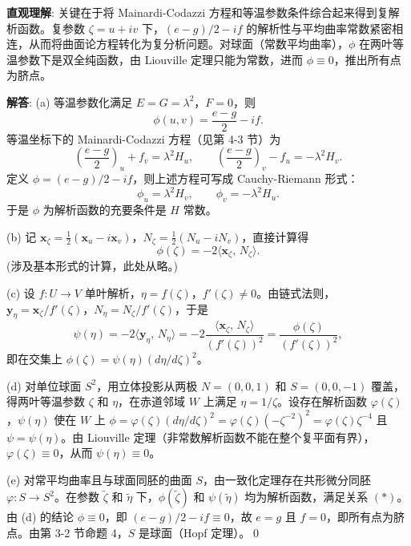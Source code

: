 \begin{solution}
\textbf{直观理解}: 关键在于将 Mainardi-Codazzi 方程和等温参数条件综合起来得到复解析函数。复参数 $\zeta = u+iv$ 下，$(e-g)/2 - if$ 的解析性与平均曲率常数紧密相连，从而将曲面论方程转化为复分析问题。对球面（常数平均曲率），$\phi$ 在两叶等温参数下是双全纯函数，由 Liouville 定理只能为常数，进而 $\phi\equiv 0$，推出所有点为脐点。

\textbf{解答}: (a) 等温参数化满足 $E=G=\lambda^2$，$F=0$，则
\[
\phi(u,v) = \frac{e-g}{2} - if.
\]
等温坐标下的 Mainardi-Codazzi 方程（见第 4-3 节）为
\[
\left(\frac{e-g}{2}\right)_u + f_v = \lambda^2 H_u,\qquad
\left(\frac{e-g}{2}\right)_v - f_u = -\lambda^2 H_v.
\]
定义 $\phi = (e-g)/2 - if$，则上述方程可写成 Cauchy-Riemann 形式：
\[
\phi_u = \lambda^2 H_v,\qquad \phi_v = -\lambda^2 H_u.
\]
于是 $\phi$ 为解析函数的充要条件是 $H$ 常数。

(b) 记 $\mathbf{x}_\zeta = \frac{1}{2}(\mathbf{x}_u - i\mathbf{x}_v)$，$N_\zeta = \frac{1}{2}(N_u - iN_v)$，直接计算得
\[
\phi(\zeta) = -2\langle \mathbf{x}_\zeta,\, N_\zeta\rangle.
\]
(涉及基本形式的计算，此处从略。)

(c) 设 $f: U\to V$ 单叶解析，$\eta = f(\zeta)$，$f'(\zeta)\neq 0$。由链式法则，$\mathbf{y}_\eta = \mathbf{x}_\zeta / f'(\zeta)$，$N_\eta = N_\zeta / f'(\zeta)$，于是
\[
\psi(\eta) = -2\langle \mathbf{y}_\eta,\, N_\eta\rangle = -2\frac{\langle\mathbf{x}_\zeta,\, N_\zeta\rangle}{(f'(\zeta))^2}
= \frac{\phi(\zeta)}{(f'(\zeta))^2},
\]
即在交集上 $\phi(\zeta) = \psi(\eta)(d\eta/d\zeta)^2$。

(d) 对单位球面 $S^2$，用立体投影从两极 $N=(0,0,1)$ 和 $S=(0,0,-1)$ 覆盖，得两叶等温参数 $\zeta$ 和 $\eta$，在赤道邻域 $W$ 上满足 $\eta = 1/\zeta$。设存在解析函数 $\varphi(\zeta)$，$\psi(\eta)$ 使在 $W$ 上 $\phi = \varphi(\zeta)(d\eta/d\zeta)^2 = \varphi(\zeta)(-\zeta^{-2})^2 = \varphi(\zeta)\zeta^{-4}$ 且 $\psi = \psi(\eta)$。由 Liouville 定理（非常数解析函数不能在整个复平面有界），$\varphi(\zeta)\equiv 0$，从而 $\psi(\eta)\equiv 0$。

(e) 对常平均曲率且与球面同胚的曲面 $S$，由一致化定理存在共形微分同胚 $\varphi: S\to S^2$。在参数 $\tilde{\zeta}$ 和 $\tilde{\eta}$ 下，$\phi(\tilde{\zeta})$ 和 $\psi(\tilde{\eta})$ 均为解析函数，满足关系 $(*)$。由 (d) 的结论 $\phi\equiv 0$，即 $(e-g)/2 - if \equiv 0$，故 $e=g$ 且 $f=0$，即所有点为脐点。由第 3-2 节命题 4，$S$ 是球面（Hopf 定理）。\qed
\end{solution}

